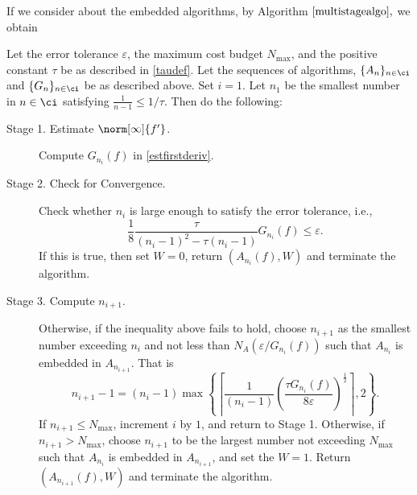 If we consider about the embedded algorithms, by Algorithm $\ref{multistagealgo},$ we obtain
\begin{algo}
Let the error tolerance $\varepsilon$, the maximum cost budget $N_{\max}$, and the positive constant $\tau$ be as described in  \eqref{taudef}. Let the sequences of algorithms, $\{A_n\}_{n \in \ci}$ and  $\{G_n\}_{n \in \ci}$ be as described above.  Set $i=1$.  Let $n_1$ be the smallest number in $n \in \ci$ satisfying $\frac{1}{n-1} \le 1/\tau$. Then do the following:
\begin{description}

\item [Stage 1. Estimate {$\norm[\infty]{f'} $}.]
Compute $G_{n_i}(f)$ in \eqref{estfirstderiv}.
\item [Stage 2. Check for Convergence.]
 Check whether $n_i$ is large enough to satisfy the error tolerance, i.e.,
$$
\frac{1}{8}\frac{\tau}{(n_i-1)^{2} - \tau (n_i-1)} G_{n_i}(f) \le \varepsilon.
$$
If this is true, then set $W=0$, return $(A_{n_i}(f),W)$ and terminate the algorithm.


\item[Stage 3. Compute $n_{i+1}$.]  Otherwise, if the inequality above fails to hold,
choose $n_{i+1}$ as the smallest number exceeding $n_i$ and not less than $N_{A}(\varepsilon /G_{n_i}(f))$ such that $A_{n_{i}}$ is embedded in $A_{n_{i+1}}$. That is
$$n_{i+1}-1=(n_i-1)\max\left\{\left\lceil\frac{1}{(n_i-1)}\left(\frac{\tau G_{n_i}(f)}{8\varepsilon}\right)^{\frac{1}{2}}\right\rceil,2\right\}.$$
 If $n_{i+1} \le N_{\max}$, increment $i$ by $1$, and return to Stage 1.
Otherwise, if $n_{i+1} > N_{\max}$, choose $n_{i+1}$ to be the largest number not exceeding $N_{\max}$ such that $A_{n_{i}}$ is embedded in $A_{n_{i+1}}$, and set the $W=1$. Return $(A_{n_{i+1}}(f),W)$ and terminate the algorithm.
\end{description}
\end{algo}

